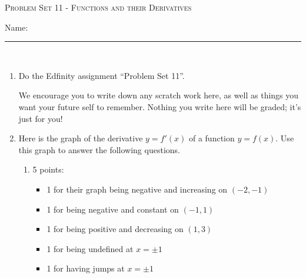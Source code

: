 \documentclass{article}
\newcommand{\doedfinity}[2][\newpage]{
  \begin{problem}[#1]
    Do the Edfinity assignment ``Problem Set #2''.

    We encourage you to write down any scratch work here, as well as
    things you want your future self to remember. Nothing you write
    here will be graded; it's just for you!
  \end{problem}
}
\begin{document}
\begin{center}
  \large\textsc{Problem Set 11 - Functions and their Derivatives}\\\vspace{.5in}
  \begin{problemonly}
   \large Name: \rule{5cm}{0.15mm}\\
   \end{problemonly}
\end{center}

\begin{enumerate}
\item  {}

  \doedfinity{11}

\item \label{sketch-derivative-and-antiderivative-1}

  Here is the graph of the derivative $y=f'(x)$ of a function $y=f(x)$.
  Use this graph to answer the following questions.


  \begin{enumerate}
  \item \label{sketch-derivative-and-antiderivative-1-f''}

    \begin{grading}
      5 points:
      \begin{itemize}[nosep]
      \item 1 for their graph being negative and increasing on $(-2, -1)$
      \item 1 for being negative and constant on $(-1, 1)$
      \item 1 for being positive and decreasing on $(1, 3)$
      \item 1 for being undefined at $x = \pm 1$
      \item 1 for having jumps at $x = \pm 1$
      \end{itemize}
    \end{grading}


\end{enumerate}
\end{enumerate}
\end{document}
